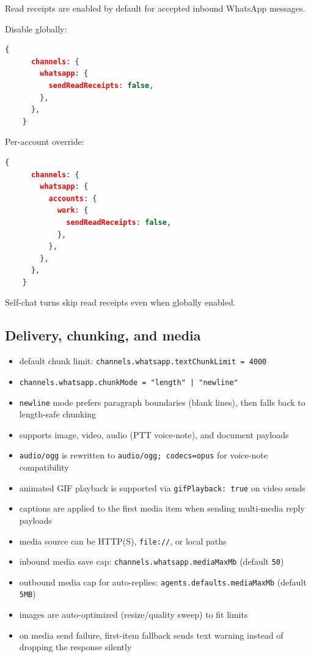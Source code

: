 Read receipts are enabled by default for accepted inbound WhatsApp messages.

Disable globally:

\begin{lstlisting}[language=json]
    {
      channels: {
        whatsapp: {
          sendReadReceipts: false,
        },
      },
    }
\end{lstlisting}


Per-account override:

\begin{lstlisting}[language=json]
    {
      channels: {
        whatsapp: {
          accounts: {
            work: {
              sendReadReceipts: false,
            },
          },
        },
      },
    }
\end{lstlisting}


Self-chat turns skip read receipts even when globally enabled.


\subsection{Delivery, chunking, and media}


\begin{itemize}
  \item default chunk limit: \texttt{channels.whatsapp.textChunkLimit = 4000}
  \item \texttt{channels.whatsapp.chunkMode = "length" | "newline"}
  \item \texttt{newline} mode prefers paragraph boundaries (blank lines), then falls back to length-safe chunking
\end{itemize}


\begin{itemize}
  \item supports image, video, audio (PTT voice-note), and document payloads
  \item \texttt{audio/ogg} is rewritten to \texttt{audio/ogg; codecs=opus} for voice-note compatibility
  \item animated GIF playback is supported via \texttt{gifPlayback: true} on video sends
  \item captions are applied to the first media item when sending multi-media reply payloads
  \item media source can be HTTP(S), \texttt{file://}, or local paths
\end{itemize}


\begin{itemize}
  \item inbound media save cap: \texttt{channels.whatsapp.mediaMaxMb} (default \texttt{50})
  \item outbound media cap for auto-replies: \texttt{agents.defaults.mediaMaxMb} (default \texttt{5MB})
  \item images are auto-optimized (resize/quality sweep) to fit limits
  \item on media send failure, first-item fallback sends text warning instead of dropping the response silently
\end{itemize}


